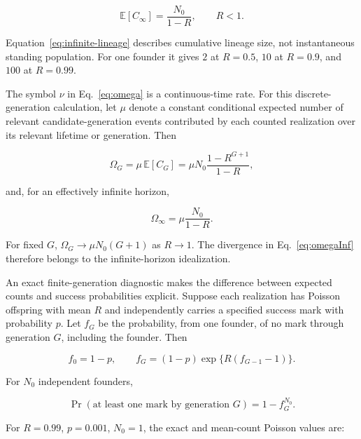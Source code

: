 \documentclass[11pt,a4paper]{article}
\begin{document}
\begin{equation}
\mathbb E[C_\infty]
=
\frac{N_0}{1-R},
\qquad R<1.
\label{eq:infinite-lineage}
\end{equation}

Equation~\eqref{eq:infinite-lineage} describes cumulative lineage size, not instantaneous standing population. For one founder it gives $2$ at $R=0.5$, $10$ at $R=0.9$, and $100$ at $R=0.99$.

The symbol $\nu$ in Eq.~\eqref{eq:omega} is a continuous-time rate. For this discrete-generation calculation, let $\mu$ denote a constant conditional expected number of relevant candidate-generation events contributed by each counted realization over its relevant lifetime or generation. Then

\begin{equation}
\Omega_G
=
\mu\,\mathbb E[C_G]
=
\mu N_0\frac{1-R^{G+1}}{1-R},
\label{eq:omegaG}
\end{equation}

and, for an effectively infinite horizon,

\begin{equation}
\Omega_\infty
=
\mu\frac{N_0}{1-R}.
\label{eq:omegaInf}
\end{equation}

For fixed $G$, $\Omega_G\to\mu N_0(G+1)$ as $R\to1$. The divergence in Eq.~\eqref{eq:omegaInf} therefore belongs to the infinite-horizon idealization.

An exact finite-generation diagnostic makes the difference between expected counts and success probabilities explicit. Suppose each realization has Poisson offspring with mean $R$ and independently carries a specified success mark with probability $p$. Let $f_G$ be the probability, from one founder, of no mark through generation $G$, including the founder. Then

\begin{equation}
f_0=1-p,
\qquad
f_G=(1-p)\exp\{R(f_{G-1}-1)\}.
\label{eq:finite-mark-recursion}
\end{equation}

For $N_0$ independent founders,

\begin{equation}
\Pr(\text{at least one mark by generation }G)
=1-f_G^{N_0}.
\label{eq:finite-mark-prob}
\end{equation}

For $R=0.99$, $p=0.001$, $N_0=1$, the exact and mean-count Poisson values are:
\end{document}
